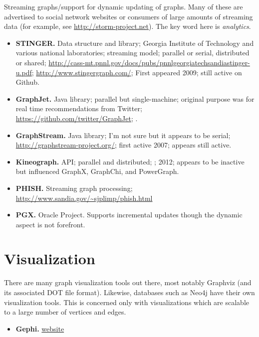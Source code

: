 \documentclass[11pt]{article}
\begin{document}
Streaming graphs/support for dynamic updating of graphs. Many of these are advertised to social network websites or consumers of large amounts of streaming data (for example, see \url{http://storm-project.net}). The key word here is \emph{analytics}.
\begin{itemize}
	\item \textbf{STINGER.} Data structure and library; Georgia Institute of Technology and various national laboratories; streaming model; parallel or serial, distributed or shared; \url{http://cass-mt.pnnl.gov/docs/pubs/pnnlgeorgiatechsandiastinger-u.pdf}; \url{http://www.stingergraph.com/}; First appeared 2009; still active on Github.

	\item \textbf{GraphJet.} Java library; parallel but single-machine; original purpose was for real time recommendations from Twitter; \url{https://github.com/twitter/GraphJet}; \cite{Sharma:2016:GraphJet}.

	\item \textbf{GraphStream.} Java library; I'm not sure but it appears to be serial; \url{http://graphstream-project.org/}; \cite{Dutot:2007:GraphStream} first active 2007; appears still active.

	\item \textbf{Kineograph.} API; parallel and distributed; \cite{Cheng:2012:Kineograph}; 2012; appears to be inactive but influenced GraphX, GraphChi, and PowerGraph.
	
	\item \textbf{PHISH.} Streaming graph processing; \url{http://www.sandia.gov/~sjplimp/phish.html}
	
	\item \textbf{PGX.} Oracle Project. Supports incremental updates though the dynamic aspect is not forefront.
\end{itemize}

\section{Visualization}
There are many graph visualization tools out there, most notably Graphviz (and its associated DOT file format). Likewise, databases such as Neo4j have their own visualization tools. This is concerned only with visualizations which are scalable to a large number of vertices and edges.

\begin{itemize}
	\item \textbf{Gephi.} \href{https://gephi.org/}{website}
\end{itemize}





\end{document}
